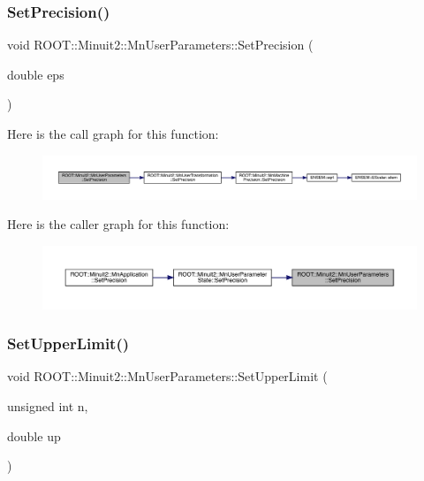 \subsubsection{\texorpdfstring{SetPrecision()}{SetPrecision()}\hspace{0.1cm}{\footnotesize\ttfamily [3/3]}}
{\footnotesize\ttfamily void R\+O\+O\+T\+::\+Minuit2\+::\+Mn\+User\+Parameters\+::\+Set\+Precision (\begin{DoxyParamCaption}\item[{double}]{eps }\end{DoxyParamCaption})\hspace{0.3cm}{\ttfamily [inline]}}

Here is the call graph for this function\+:
\nopagebreak
\begin{figure}[H]
\begin{center}
\leavevmode
\includegraphics[width=350pt]{d6/d10/classROOT_1_1Minuit2_1_1MnUserParameters_aceaa10ac8b2c83261c3cc026705ee6e0_cgraph}
\end{center}
\end{figure}
Here is the caller graph for this function\+:
\nopagebreak
\begin{figure}[H]
\begin{center}
\leavevmode
\includegraphics[width=350pt]{d6/d10/classROOT_1_1Minuit2_1_1MnUserParameters_aceaa10ac8b2c83261c3cc026705ee6e0_icgraph}
\end{center}
\end{figure}
\mbox{\label{classROOT_1_1Minuit2_1_1MnUserParameters_a9127811ac07731aea64f1869a620d11b}} 
\subsubsection{\texorpdfstring{SetUpperLimit()}{SetUpperLimit()}\hspace{0.1cm}{\footnotesize\ttfamily [1/6]}}
{\footnotesize\ttfamily void R\+O\+O\+T\+::\+Minuit2\+::\+Mn\+User\+Parameters\+::\+Set\+Upper\+Limit (\begin{DoxyParamCaption}\item[{unsigned int}]{n,  }\item[{double}]{up }\end{DoxyParamCaption})}

